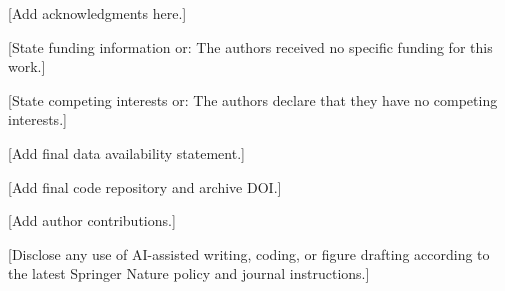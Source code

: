 [Add acknowledgments here.]

[State funding information or: The authors received no specific funding for this work.]

[State competing interests or: The authors declare that they have no competing interests.]

[Add final data availability statement.]

[Add final code repository and archive DOI.]

[Add author contributions.]

[Disclose any use of AI-assisted writing, coding, or figure drafting according to the latest Springer Nature policy and journal instructions.]
